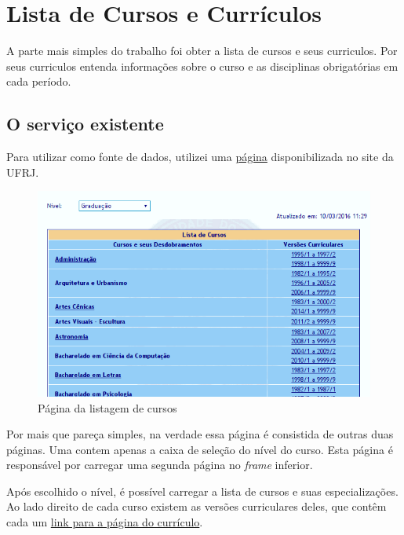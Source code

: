 \section{Lista de Cursos e Currículos}

A parte mais simples do trabalho foi obter a lista de cursos e seus curriculos. Por seus curriculos entenda informações sobre o curso e as disciplinas obrigatórias em cada período.

\subsection{O serviço existente}

Para utilizar como fonte de dados, utilizei uma \href{https://siga.ufrj.br/sira/repositorio-curriculo/ListaCursos.html}{página} disponibilizada no site da UFRJ.

\begin{figure}[!ht]
\centering
	\includegraphics[width=\textwidth]{lista_cursos.png}
\caption{Página da listagem de cursos}
\label{fig:cursos}
\end{figure}

Por mais que pareça simples, na verdade essa página é consistida de outras duas páginas. Uma contem apenas a caixa de seleção do nível do curso. Esta página é responsável por carregar uma segunda página no \textit{frame} inferior.

Após escolhido o nível, é possível carregar a lista de cursos e suas especializações. Ao lado direito de cada curso existem as versões curriculares deles, que contêm cada um \href{https://siga.ufrj.br/sira/temas/zire/frameConsultas.jsp?mainPage=/repositorio-curriculo/61AD45DD-92A4-F79B-3D87-7A444052DF9B.html}{link para a página do currículo}.

